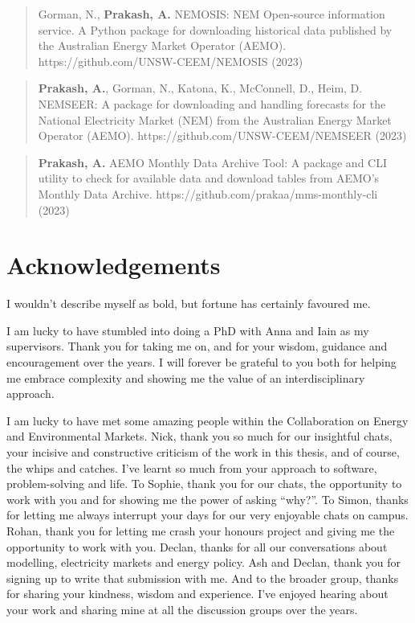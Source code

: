 \documentclass[12pt,a4paper,]{report}
\begin{document}
\begin{quote}
Gorman, N., \textbf{Prakash, A.} NEMOSIS: NEM Open-source information
service. A Python package for downloading historical data published by
the Australian Energy Market Operator (AEMO).
https://github.com/UNSW-CEEM/NEMOSIS (2023)
\end{quote}

\begin{quote}
\textbf{Prakash, A.}, Gorman, N., Katona, K., McConnell, D., Heim, D.
NEMSEER: A package for downloading and handling forecasts for the
National Electricity Market (NEM) from the Australian Energy Market
Operator (AEMO). https://github.com/UNSW-CEEM/NEMSEER (2023)
\end{quote}

\begin{quote}
\textbf{Prakash, A.} AEMO Monthly Data Archive Tool: A package and CLI
utility to check for available data and download tables from AEMO's
Monthly Data Archive. https://github.com/prakaa/mms-monthly-cli (2023)
\end{quote}

\hypertarget{acknowledgements}{%
\chapter*{Acknowledgements}\label{acknowledgements}}

I wouldn't describe myself as bold, but fortune has certainly favoured
me.

I am lucky to have stumbled into doing a PhD with Anna and Iain as my
supervisors. Thank you for taking me on, and for your wisdom, guidance
and encouragement over the years. I will forever be grateful to you both
for helping me embrace complexity and showing me the value of an
interdisciplinary approach.

I am lucky to have met some amazing people within the Collaboration on
Energy and Environmental Markets. Nick, thank you so much for our
insightful chats, your incisive and constructive criticism of the work
in this thesis, and of course, the whips and catches. I've learnt so
much from your approach to software, problem-solving and life. To
Sophie, thank you for our chats, the opportunity to work with you and
for showing me the power of asking ``why?''. To Simon, thanks for
letting me always interrupt your days for our very enjoyable chats on
campus. Rohan, thank you for letting me crash your honours project and
giving me the opportunity to work with you. Declan, thanks for all our
conversations about modelling, electricity markets and energy policy.
Ash and Declan, thank you for signing up to write that submission with
me. And to the broader group, thanks for sharing your kindness, wisdom
and experience. I've enjoyed hearing about your work and sharing mine at
all the discussion groups over the years.
\end{document}
